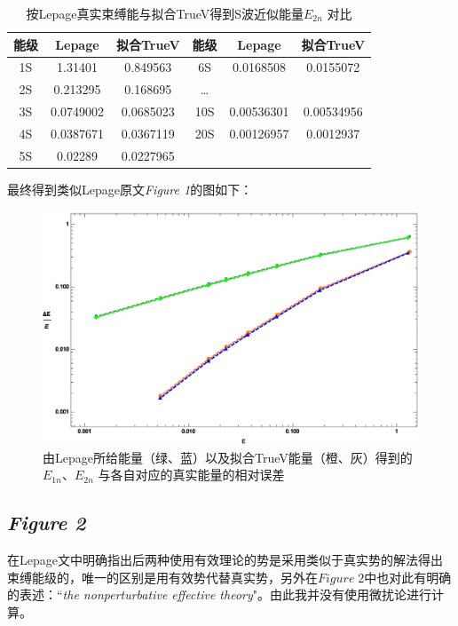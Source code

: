 \documentclass[hyperref,cs4size,titlepage,twoside]{ctexart}
\begin{document}
\begin{table}[!htbp]
  \centering
  \begin{tabular}{|cccccc|}
    \hline
    能级 & Lepage & 拟合TrueV & 能级 & Lepage & 拟合TrueV \\
    \hline
    1S & 1.31401 & 0.849563 & 6S & 0.0168508 & 0.0155072 \\
    2S & 0.213295 & 0.168695  & \dots &   & \\
    3S & 0.0749002 & 0.0685023 & 10S & 0.00536301 & 0.00534956 \\
    4S & 0.0387671 & 0.0367119 & 20S & 0.00126957 & 0.0012937 \\
    5S & 0.02289 & 0.0227965  &  &  &  \\
    \hline
  \end{tabular}
  \caption{按Lepage真实束缚能与拟合TrueV得到S波近似能量$E_{2n}$ 对比}\label{e2nfigure1}
\end{table}

最终得到类似Lepage原文\emph{Figure 1}的图如下：
\begin{figure}[!htbp]
  \centering
  \includegraphics[width=5.2in]{Test_LepageFigure_1.eps}
  \caption{由Lepage所给能量（绿、蓝）以及拟合TrueV能量（橙、灰）得到的$E_{1n}$、$E_{2n}$ 与各自对应的真实能量的相对误差}\label{LepageFigure1}
\end{figure}
\subsection{\emph{Figure 2}}
在Lepage文中明确指出后两种使用有效理论的势是采用类似于真实势的解法得出束缚能级的，唯一的区别是用有效势代替真实势，另外在$Figure\;2$中也对此有明确的表述：“\emph{the nonperturbative effective theory}"。由此我并没有使用微扰论进行计算。
\end{document}
